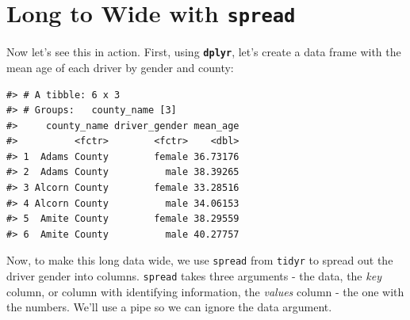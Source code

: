 \documentclass[]{book}
\newenvironment{Shaded}{\begin{snugshade}}{\end{snugshade}}
\newcommand{\KeywordTok}[1]{\textcolor[rgb]{0.13,0.29,0.53}{\textbf{#1}}}
\newcommand{\DataTypeTok}[1]{\textcolor[rgb]{0.13,0.29,0.53}{#1}}
\newcommand{\StringTok}[1]{\textcolor[rgb]{0.31,0.60,0.02}{#1}}
\newcommand{\OtherTok}[1]{\textcolor[rgb]{0.56,0.35,0.01}{#1}}
\newcommand{\OperatorTok}[1]{\textcolor[rgb]{0.81,0.36,0.00}{\textbf{#1}}}
\newcommand{\NormalTok}[1]{#1}
\theoremstyle{definition}
\theoremstyle{definition}
\theoremstyle{definition}
\theoremstyle{remark}
\begin{document}
\section{\texorpdfstring{Long to Wide with
\texttt{spread}}{Long to Wide with spread}}\label{long-to-wide-with-spread}

Now let's see this in action. First, using \textbf{\texttt{dplyr}},
let's create a data frame with the mean age of each driver by gender and
county:

\begin{Shaded}
\end{Shaded}

\begin{verbatim}
#> # A tibble: 6 x 3
#> # Groups:   county_name [3]
#>     county_name driver_gender mean_age
#>          <fctr>        <fctr>    <dbl>
#> 1  Adams County        female 36.73176
#> 2  Adams County          male 38.39265
#> 3 Alcorn County        female 33.28516
#> 4 Alcorn County          male 34.06153
#> 5  Amite County        female 38.29559
#> 6  Amite County          male 40.27757
\end{verbatim}

Now, to make this long data wide, we use \texttt{spread} from
\texttt{tidyr} to spread out the driver gender into columns.
\texttt{spread} takes three arguments - the data, the \emph{key} column,
or column with identifying information, the \emph{values} column - the
one with the numbers. We'll use a pipe so we can ignore the data
argument.

\begin{Shaded}
\end{Shaded}
\end{document}
